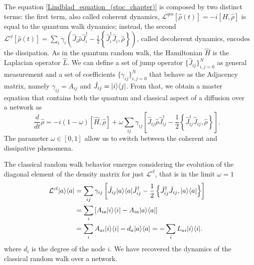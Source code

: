 The equation \eqref{Lindblad_equation_(stoc_chapter)} is composed by two distinct terms: the first term, also called coherent dynamics,
$\mathcal{L}^{qm}\left[\hat\rho(t)\right] = -i\left[H,\hat\rho\right]$ 
is equal to the quantum walk dynamics; instead, the second 
$\mathcal{L}^{cl}\left[\hat\rho(t)\right] = \sum_i \gamma_i \left(\hat J_i \hat\rho \hat J^\dagger_i - \frac{1}{2}\left\{ \hat J^\dagger_i\hat J_i, \hat\rho\right\} \right)$, 
called decoherent dynamics, encodes the dissipation. 
As in the quantum random walk, the Hamiltonian $\hat H$ is the Laplacian operator $\hat L$.
We can define a set of jump operator $\{\hat J_{ij} \}_{i,j=0}^{N}$ as general measurement and a set of coefficients $\{\gamma_{ij}\}_{i,j=0}^{N}$ that behave as the Adjacency matrix, namely $\gamma_{ij} =A_{ij}$ and $\hat J_{ij} = \lvert i\rangle\langle j\rvert$.
From that, we obtain a master equation that contains both the quantum and classical aspect of a diffusion over a network as
\begin{equation}\label{stochastic_lindblad_master}
    \frac{d}{dt}\hat \rho = -i(1-\omega)\left[\hat H,\hat\rho\right] + \omega\sum_{ij}\gamma_{ij}\left[\hat J_{ij} \hat\rho\hat J_{ij}^\dagger -\frac{1}{2} \left\{ \hat J_{ij}^\dagger \hat J_{ij}, \hat\rho\right\}\right].
\end{equation}
The parameter $\omega \in [0,1]$ allow us to switch between the coherent and dissipative phenomena.

The classical random walk behavior emerges considering the evolution of the diagonal element of the density matrix for just $\mathcal{L}^{cl}$, that is in the limit $\omega = 1$
\begin{equation}
    \begin{split}
        \mathcal{L}^{cl}\lvert a\rangle\langle a\rvert &=  \sum_{ij}\gamma_{ij}\left[\hat J_{ij} \lvert a\rangle\langle a\rvert\hat J_{ij}^\dagger -\frac{1}{2} \left\{ \hat J_{ij}^\dagger \hat J_{ij}, \lvert a\rangle\langle a\rvert\right\}\right]\\
        &= \sum_{i}\left[A_{ia} \lvert i\rangle\langle i\rvert -A_{ia}\lvert a\rangle\langle a\rvert\right]\\
        &=\sum_{i} A_{ai} \lvert i\rangle\langle i\rvert - d_a \lvert a\rangle\langle a\rvert = -\sum_i L_{ai} \lvert i\rangle\langle i\rvert.
    \end{split}
\end{equation} 
where $d_i$ is the degree of the node $i$.
We have recovered the dynamics of the classical random walk over a network.

